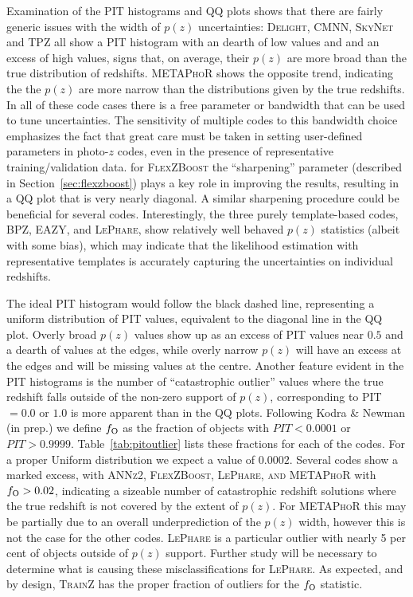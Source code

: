 Examination of the PIT histograms and QQ plots shows that there are fairly generic issues with the width of $p(z)$ uncertainties: \textsc{Delight, CMNN, SkyNet} and \textsc{TPZ} all show a PIT histogram with an dearth of low values and and an excess of high values, signs that, on average, their $p(z)$ are more broad than the true distribution of redshifts.  \textsc{METAPhoR} shows the opposite trend, indicating the the $p(z)$  are more narrow than the distributions given by the true redshifts.  In all of these code cases there is a free parameter or bandwidth that can be used to tune uncertainties.  The sensitivity of multiple codes to this bandwidth choice emphasizes the fact that great care must be taken in setting user-defined parameters in photo-$z$ codes, even in the presence of representative training/validation data.  for \textsc{FlexZBoost} the ``sharpening'' parameter (described in Section~\ref{sec:flexzboost}) plays a key role in improving the results, resulting in a QQ plot that is very nearly diagonal.  A similar sharpening procedure could be beneficial for several codes.
Interestingly, the three purely template-based codes, \textsc{BPZ, EAZY}, and \textsc{LePhare}, show relatively well behaved $p(z)$ statistics (albeit with some bias), which may indicate that the likelihood estimation with representative templates is accurately capturing the uncertainties on individual redshifts.

The ideal PIT histogram would follow the black dashed line, representing a uniform distribution of PIT values, equivalent to the diagonal line in the QQ plot.
Overly broad $p(z)$ values show up as an excess of PIT values near $0.5$ and a dearth of values at the edges, while overly narrow $p(z)$ will have an excess at the edges and will be missing values at the centre.
Another feature evident in the PIT histograms is the number of ``catastrophic outlier'' values where the true redshift falls outside of the non-zero support of $p(z)$, corresponding to PIT$=0.0$ or $1.0$ is more apparent than in the QQ plots.  Following Kodra \& Newman (in prep.) we define $f_{\rm O}$ as the fraction of objects with $PIT<0.0001$ or $PIT>0.9999$.  Table~\ref{tab:pitoutlier} lists these fractions for each of the codes. For a proper Uniform distribution we expect a value of $0.0002$.  Several codes show a marked excess, with \textsc{ANNz2, FlexZBoost, LePhare, and METAPhoR} with $f_{\rm O} > 0.02$, indicating a sizeable number of catastrophic redshift solutions where the true redshift is not covered by the extent of $p(z)$.  For \textsc{METAPhoR} this may be partially due to an overall underprediction of the $p(z)$ width, however this is not the case for the other codes.  \textsc{LePhare} is a particular outlier with nearly 5 per cent of objects outside of $p(z)$ support.  Further study will be necessary to determine what is causing these misclassifications for \textsc{LePhare}.  As expected, and by design, \textsc{TrainZ} has the proper fraction of outliers for the $f_{\rm O}$ statistic.


